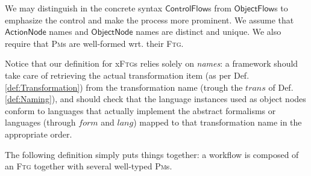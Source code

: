 We may distinguish in the concrete syntax $\mathsf{ControlFlow}$s from 
$\mathsf{ObjectFlow}$s to emphasize the control and make the process more 
prominent. 
We assume that $\mathsf{ActionNode}$ names and $\mathsf{ObjectNode}$ names 
are distinct and unique. We also require that \textsc{Pm}s are well-formed 
wrt. their \textsc{Ftg}.

Notice that our definition for x\textsc{Ftg}s relies solely on \emph{names}: a 
framework should take care of retrieving the actual transformation item (as per 
Def. \ref{def:Transformation}) from the transformation name (trough 
the $trans$ of Def. \ref{def:Naming}), and should check that the language 
instances used as object nodes conform to languages that actually implement the 
abstract formalisms or languages (through $form$ and $lang$) mapped to that 
transformation name in the appropriate 
order.

\medskip
The following definition simply puts things together: a workflow is composed of 
an \textsc{Ftg} together with several well-typed \textsc{Pm}s. 

